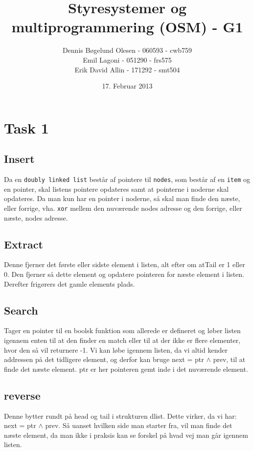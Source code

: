 \documentclass[a4paper,12pt]{article}
\title{Styresystemer og multiprogrammering (OSM) - G1}
\author{Dennis Bøgelund Olesen - 060593 - cwb759 \\ Emil Lagoni - 051290 - frs575 \\ Erik David Allin - 171292 - smt504}
\date{17. Februar 2013}
\begin{document}
\maketitle %
\thispagestyle{empty}
\setcounter{page}{0}
\newpage



\section*{Task 1}
\subsection*{Insert}
Da en \texttt{doubly linked list} består af pointere til \texttt{nodes}, som består af en \texttt{item} og en pointer, skal listens pointere opdateres samt at pointerne i noderne skal opdateres. Da man kun har en pointer i noderne, så skal man finde den næste, eller forrige, vha. \texttt{xor} mellem den nuværende nodes adresse og den forrige, eller næste, nodes adresse.

\subsection*{Extract}
Denne fjerner det første eller sidste element i listen, alt efter om atTail er 1 eller 0. Den fjerner så dette element og opdatere pointeren for næste element i listen. Derefter frigørers det gamle  elements plads.

\subsection*{Search}
Tager en pointer til en boolsk funktion som allerede er defineret og løber listen igennem enten til at den finder en match eller til at der ikke er flere elementer, hvor den så vil returnere -1. 
Vi kan løbe igennem listen, da vi altid kender addressen på det tidligere element, og derfor kan bruge next = ptr $\wedge$ prev, til at finde det næste element. ptr er her pointeren gemt inde i det nuværende element. 

\subsection*{reverse}
Denne bytter rundt på head og tail i strukturen dlist. Dette virker, da vi har:\\
next = ptr $\wedge$ prev. Så uanset hvilken side man starter fra, vil man finde det næste element, da man ikke i praksis kan se forskel på hvad vej man går igennem listen.
\end{document}
